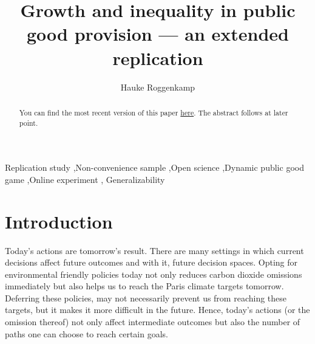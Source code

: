 \documentclass[
  authoryear,
  preprint,
  3p]{elsarticle}
\begin{document}
\begin{frontmatter}
\title{Growth and inequality in public good provision --- an extended
replication}
\author[1,2]{Hauke Roggenkamp%
%
}



        
\begin{abstract}
You can find the most recent version of this paper
\href{https://github.com/Howquez/coopUncertainty/blob/main/analysis/quarto/paper.pdf}{here}.
The abstract follows at later point.
\end{abstract}





\begin{keyword}
    Replication study \sep Non-convenience sample \sep Open
science \sep Dynamic public good game \sep Online experiment \sep 
    Generalizability
\end{keyword}
\end{frontmatter}\ifdefined\Shaded\renewenvironment{Shaded}{\begin{tcolorbox}[boxrule=0pt, enhanced, breakable, borderline west={3pt}{0pt}{shadecolor}, frame hidden, interior hidden, sharp corners]}{\end{tcolorbox}}\fi

\hypertarget{sec-intro}{%
\section{Introduction}\label{sec-intro}}

Today's actions are tomorrow's result. There are many settings in which
current decisions affect future outcomes and with it, future decision
spaces. Opting for environmental friendly policies today not only
reduces carbon dioxide omissions immediately but also helps us to reach
the Paris climate targets tomorrow. Deferring these policies, may not
necessarily prevent us from reaching these targets, but it makes it more
difficult in the future. Hence, today's actions (or the omission
thereof) not only affect intermediate outcomes but also the number of
paths one can choose to reach certain goals.
\end{document}
